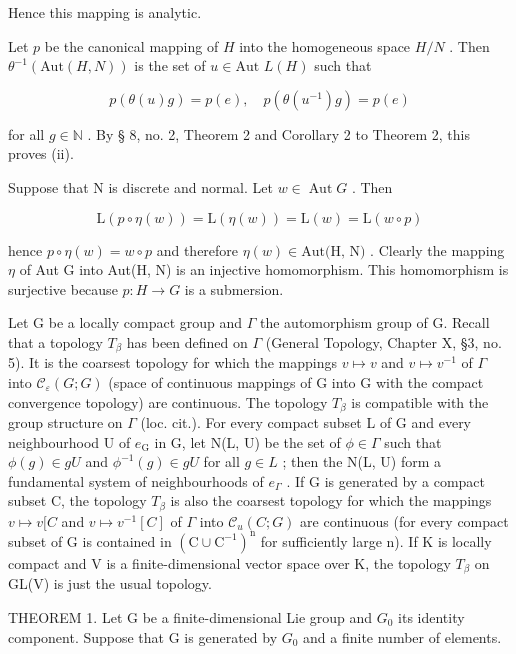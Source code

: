 Hence this mapping is analytic.

Let \(p\) be the canonical mapping of \(H\) into the homogeneous space \(H/N\) . Then \(\theta^{-1}(\text{Aut}(H, N))\) is the set of \(u \in \text{Aut } L(H)\) such that

\[
p (\theta (u) g) = p (e), \quad p (\theta (u ^ {- 1}) g) = p (e)
\]

for all \(g \in \mathbb{N}\) . By § 8, no. 2, Theorem 2 and Corollary 2 to Theorem 2, this proves (ii).

Suppose that N is discrete and normal. Let \(w \in \operatorname{Aut} G\) . Then

\[
\mathrm{L} (p \circ \eta (w)) = \mathrm{L} (\eta (w)) = \mathrm{L} (w) = \mathrm{L} (w \circ p)
\]

hence \(p \circ \eta(w) = w \circ p\) and therefore \(\eta(w) \in \text{Aut(H, N)}\) . Clearly the mapping \(\eta\) of Aut G into Aut(H, N) is an injective homomorphism. This homomorphism is surjective because \(p: H \to G\) is a submersion.

Let G be a locally compact group and \(\Gamma\) the automorphism group of G. Recall that a topology \(T_{\beta}\) has been defined on \(\Gamma\) (General Topology, Chapter X, §3, no. 5). It is the coarsest topology for which the mappings \(v \mapsto v\) and \(v \mapsto v^{-1}\) of \(\Gamma\) into \(\mathcal{C}_{\varepsilon}(G; G)\) (space of continuous mappings of G into G with the compact convergence topology) are continuous. The topology \(T_{\beta}\) is compatible with the group structure on \(\Gamma\) (loc. cit.). For every compact subset L of G and every neighbourhood U of \(e_{\mathrm{G}}\) in G, let N(L, U) be the set of \(\phi \in \Gamma\) such that \(\phi(g) \in gU\) and \(\phi^{-1}(g) \in gU\) for all \(g \in L\) ; then the N(L, U) form a fundamental system of neighbourhoods of \(e_{\Gamma}\) . If G is generated by a compact subset C, the topology \(T_{\beta}\) is also the coarsest topology for which the mappings \(v \mapsto v[C\) and \(v \mapsto v^{-1}[C]\) of \(\Gamma\) into \(\mathcal{C}_{u}(C; G)\) are continuous (for every compact subset of G is contained in \((\mathrm{C} \cup \mathrm{C}^{-1})^{\mathrm{n}}\) for sufficiently large n). If K is locally compact and V is a finite-dimensional vector space over K, the topology \(T_{\beta}\) on GL(V) is just the usual topology.

THEOREM 1. Let G be a finite-dimensional Lie group and \(G_{0}\) its identity component. Suppose that G is generated by \(G_{0}\) and a finite number of elements.

